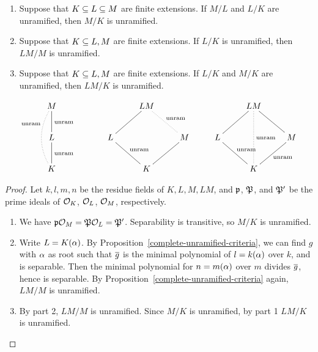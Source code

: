 \begin{pr}$\,$
\begin{enumerate}
\item
Suppose that $K\subseteq L\subseteq M$ are finite extensions. If $M/L$ and $L/K$ are unramified, then $M/K$ is unramified.
\item
Suppose that $K\subseteq L,M$ are finite extensions. If $L/K$ is unramified, then $LM/M$ is unramified.
\item
Suppose that $K\subseteq L,M$ are finite extensions. If $L/K$ and $M/K$ are unramified, then $LM/K$ is unramified.
\end{enumerate}
\[
\xymatrix{
M\ar@{-}[d]^{\text{unram}}\ar@/_1pc/@{.}[dd]_<<<<<<<{\text{unram}}&&&LM\ar@{-}[ld]\ar@{.}[rd]^{\text{unram}}&&&LM\ar@{.}[dd]^{\text{unram}}\ar@{-}[rd]\ar@{-}[ld]&\\
L\ar@{-}[d]^{\text{unram}}&&L\ar@{-}[rd]^{\text{unram}}&& M\ar@{-}[ld]&L\ar@{-}[rd]^{\text{unram}}&&M\ar@{-}[ld]^{\text{unram}}\\
K&&&K&&&K&
}
\]
\end{pr}
\begin{proof}
Let $k,l,m,n$ be the residue fields of $K,L,M,LM$, and $\mathfrak{p}$, $\mathfrak{P}$, and $\mathfrak{P}'$ be the prime ideals of $\mathcal{O}_K$, $\mathcal{O}_L$, $\mathcal{O}_M$, respectively.
\begin{enumerate}
\item We have $\mathfrak{p}\mathcal{O}_M=\mathfrak{P}\mathcal{O}_L=\mathfrak{P}'$. Separability is transitive, so $M/K$ is unramified.
\item Write $L=K(\alpha)$. By Proposition~\ref{complete-unramified-criteria}, we can find $g$ with $\alpha$ as root such that $\overline{g}$ is the minimal polynomial of $l=k(\alpha)$ over $k$, and is separable. Then the minimal polynomial for $n=m(\alpha)$ over $m$ divides $\overline{g}$, hence is separable. By Proposition~\ref{complete-unramified-criteria} again, $LM/M$ is unramified.
\item By part 2, $LM/M$ is unramified. Since $M/K$ is unramified, by part 1 $LM/K$ is unramified.\qedhere
\end{enumerate}
\end{proof}
